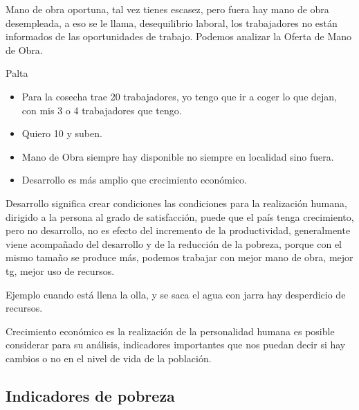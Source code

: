 \documentclass[
  letterpaper,
  DIV=11,
  numbers=noendperiod]{scrartcl}
\begin{document}
Mano de obra oportuna, tal vez tienes escasez, pero fuera hay mano de
obra desempleada, a eso se le llama, desequilibrio laboral, los
trabajadores no están informados de las oportunidades de trabajo.
Podemos analizar la Oferta de Mano de Obra.

Palta

\begin{itemize}
\item
  Para la cosecha trae 20 trabajadores, yo tengo que ir a coger lo que
  dejan, con mis 3 o 4 trabajadores que tengo.
\item
  Quiero 10 y suben.
\item
  Mano de Obra siempre hay disponible no siempre en localidad sino
  fuera.
\item
  Desarrollo es más amplio que crecimiento económico.
\end{itemize}

Desarrollo significa crear condiciones las condiciones para la
realización humana, dirigido a la persona al grado de satisfacción,
puede que el país tenga crecimiento, pero no desarrollo, no es efecto
del incremento de la productividad, generalmente viene acompañado del
desarrollo y de la reducción de la pobreza, porque con el mismo tamaño
se produce más, podemos trabajar con mejor mano de obra, mejor tg, mejor
uso de recursos.

Ejemplo cuando está llena la olla, y se saca el agua con jarra hay
desperdicio de recursos.

Crecimiento económico es la realización de la personalidad humana es
posible considerar para su análisis, indicadores importantes que nos
puedan decir si hay cambios o no en el nivel de vida de la población.

\hypertarget{indicadores-de-pobreza}{%
\subsection{Indicadores de pobreza}\label{indicadores-de-pobreza}}
\end{document}
